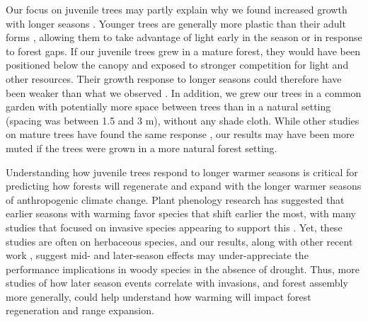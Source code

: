 \documentclass{article}\usepackage[]{graphicx}\usepackage[]{xcolor}
\begin{document}
Our focus on juvenile trees may partly explain why we found increased growth with longer seasons \citep{augspurger_differences_2003,sweeney_comparison_2024}. Younger trees are generally more plastic than their adult forms \citep{augspurger_differences_2003,way_photoperiod_2015}, allowing them to take advantage of light early in the season or in response to forest gaps. If our juvenile trees grew in a mature forest, they would have been positioned below the canopy and exposed to stronger competition for light and other resources. Their growth response to longer seasons could therefore have been weaker than what we observed
\citep{cleland_effects_2024,augspurger_differences_2003,sweeney_comparison_2024,polgar_leafout_2011}. In addition, we grew our trees in a common garden with potentially more space between trees than in a natural setting (spacing was between 1.5 and 3 m), without any shade cloth. While other studies on mature trees have found the same response \citep{finzi_carbon_2020}, our results may have been more muted if the trees were grown in a more natural forest setting. 

Understanding how juvenile trees respond to longer warmer seasons is critical for predicting how forests will regenerate and expand with the longer warmer seasons of anthropogenic climate change. Plant phenology research has suggested that earlier seasons with warming favor species that shift earlier the most, with many studies that focused on invasive species appearing to support this \citep{wolkovich_temperaturedependent_2013,zettlemoyer_phenology_2019}. Yet, these studies are often on herbaceous species, and our results, along with other recent work \citep{zani_increased_2020,zohner_effect_2023}, suggest mid- and later-season effects may under-appreciate the performance implications in woody species in the absence of drought. Thus, more studies of how later season events correlate with invasions, and forest assembly more generally, could help understand how warming will impact forest regeneration and range expansion.
\end{document}
